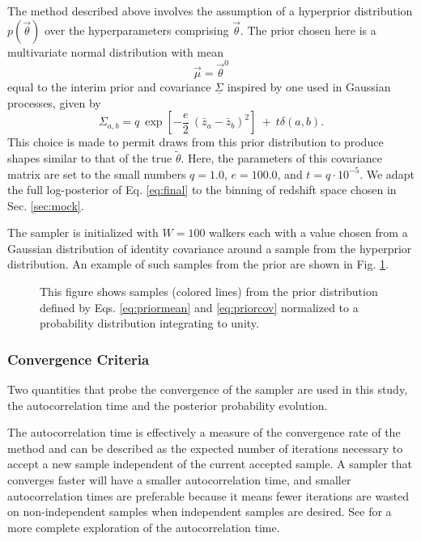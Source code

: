 \documentclass[preprint]{aastex}
\newcommand{\textul}{\underline}
\begin{document}
The method described above involves the assumption of a hyperprior distribution 
$p(\vec{\theta})$ over the hyperparameters comprising $\vec{\theta}$.  The 
prior chosen here is a multivariate normal distribution with mean 
\begin{equation}\label{eq:priormean}\vec{\mu}=\vec{\theta}^{0}\end{equation} 
equal to the interim prior and covariance $\textul{\Sigma}$ inspired by one 
used in Gaussian processes, given by 
\begin{equation}\label{eq:priorcov}\Sigma_{a,b} = q\ \exp[-\frac{e}{2}\ 
(\bar{z}_{a}-\bar{z}_{b})^{2}]\ +\ t\delta(a,b).\end{equation}  This choice is 
made to permit draws from this prior distribution to produce shapes similar to 
that of the true $\tilde{\theta}$.  Here, the parameters of this covariance 
matrix are set to the small numbers $q=1.0$, $e=100.0$, and $t=q\cdot10^{-5}$.  
We adapt the full log-posterior of Eq. \ref{eq:final} to the binning of 
redshift space chosen in Sec. \ref{sec:mock}.

The sampler is initialized with $W=100$ walkers each with a value chosen from a 
Gaussian distribution of identity covariance around a sample from the 
hyperprior distribution.  An example of such samples from the prior are shown 
in Fig. \ref{fig:prior}.

\begin{figure}
\caption{This figure shows samples (colored lines) from the prior distribution 
defined by Eqs. \ref{eq:priormean} and \ref{eq:priorcov} normalized to a 
probability distribution integrating to unity.}
\label{fig:prior}
\end{figure}

\subsubsection{Convergence Criteria}
\label{sec:acorr}

Two quantities that probe the convergence of the sampler are used in this 
study, the autocorrelation time and the posterior probability evolution.

The autocorrelation time is effectively a measure of the convergence rate of 
the method and can be described as the expected number of iterations necessary 
to accept a new sample independent of the current accepted sample.  A sampler 
that converges faster will have a smaller autocorrelation time, and smaller 
autocorrelation times are preferable because it means fewer iterations are 
wasted on non-independent samples when independent samples are desired.  See 
\citet{Foreman-Mackey2013} for a more complete exploration of the 
autocorrelation time.  
\end{document}
